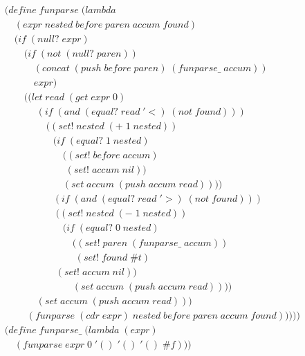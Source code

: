 \begin{figure}[htp]
\caption{}\label{fig:funParse}
\begin{align*}
& (define \; funparse \; (lambda \; 
\\& \quad (expr \; nested \; before \; paren \; accum \; found) \; 
\\& \quad (if \; (null? \; expr)
\\& \qquad (if \; (not \; (null? \; paren))
\\& \qquad \quad (concat \; (push \; before \; paren) \; (funparse\_ \; accum))
\\& \qquad \quad expr)
\\& \qquad ((let \; read \; (get \; expr \; 0)
\\& \qquad \quad \; (if \; (and \; (equal? \; read \; '<) \; (not \; found)))
\\& \qquad \qquad \; ((set! \; nested \; (+ \; 1 \; nested))
\\& \qquad \qquad \quad (if \; (equal? \; 1 \; nested)
\\& \qquad \qquad \qquad ((set! \; before \; accum)
\\& \qquad \qquad \qquad \; (set! \; accum \; nil))
\\& \qquad \qquad \qquad (set \; accum \; (push \; accum \; read))))
\\& \qquad \qquad \quad (if \; (and \; (equal? \; read \; '>) \; (not \; found)))
\\& \qquad \qquad \quad \; ((set! \; nested \; (- \; 1 \; nested))
\\& \qquad \qquad \qquad (if \; (equal? \; 0 \; nested)
\\& \qquad \qquad \qquad \quad ((set! \; paren \; (funparse\_ \; accum))
\\& \qquad \qquad \qquad \quad \; (set! \; found \; \#t)
\\& \qquad \qquad \quad \; (set! \; accum \; nil))
\\& \qquad \qquad \qquad \quad (set \; accum \; (push \; accum \; read))))
\\& \qquad \quad \; (set \; accum \; (push \; accum \; read)))
\\& \qquad \; (funparse \; (cdr \; expr) \; nested \; before \; paren \; accum \; found)))))
\\& (define \; funparse\_ \; (lambda \; (expr)
\\& \quad (funparse \; expr \; 0 \; '() \; '() \; '() \; \#f))) \; 
\end{align*}
\end{figure}

